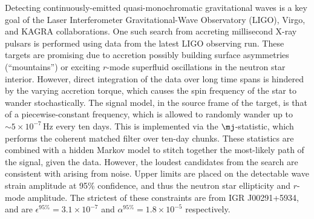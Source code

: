 Detecting continuously-emitted quasi-monochromatic gravitational waves is a key goal of the Laser Interferometer Gravitational-Wave Observatory (LIGO), Virgo, and KAGRA collaborations. One such search from accreting millisecond X-ray pulsars is performed using data from the latest LIGO observing run. These targets are promising due to accretion possibly building surface asymmetries (``mountains'') or exciting $r$-mode superfluid oscillations in the neutron star interior. However, direct integration of the data over long time spans is hindered by the varying accretion torque, which causes the spin frequency of the star to wander stochastically. The signal model, in the source frame of the target, is that of a piecewise-constant frequency, which is allowed to randomly wander up to $\sim5\times10^{-7}\,$Hz every ten days. This is implemented via the $\mj$-statistic, which performs the coherent matched filter over ten-day chunks. These statistics are combined with a hidden Markov model to stitch together the most-likely path of the signal, given the data. However, the loudest candidates from the search are consistent with arising from noise. Upper limits are placed on the detectable wave strain amplitude at 95\% confidence, and thus the neutron star ellipticity and $r$-mode amplitude. The strictest of these constraints are from IGR J00291+5934, and are $\epsilon^{95\%} = 3.1\times10^{-7}$ and $\alpha^{95\%} = 1.8\times 10^{-5}$ respectively.
